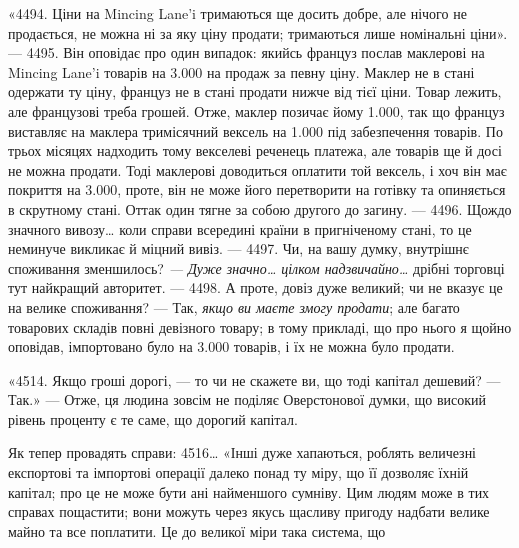 «4494. Ціни на Mincing Lane’i тримаються ще досить добре, але нічого
не продається, не можна ні за яку ціну продати; тримаються лише номінальні
ціни». — 4495. Він оповідає про один випадок: якийсь француз послав маклерові
на Mincing Lane’i товарів на \num{3.000} на продаж за певну ціну. Маклер
не в стані одержати ту ціну, француз не в стані продати нижче від тієї
ціни. Товар лежить, але французові треба грошей. Отже, маклер позичає йому \num{1.000}, так що
француз виставляє на маклера тримісячний вексель на \num{1.000} під забезпечення товарів. По трьох
місяцях надходить тому векселеві
реченець платежа, але товарів ще й досі не можна продати. Тоді маклерові
доводиться оплатити той вексель, і хоч він має покриття на \num{3.000},
проте, він не може його перетворити на готівку та опиняється в скрутному
стані. Оттак один тягне за собою другого до загину. — 4496. Щождо значного
вивозу\dots{} коли справи всередині країни в пригніченому стані, то це неминуче
викликає й міцний вивіз. — 4497. Чи, на вашу думку, внутрішнє споживання зменшилось?
\emph{— Дуже значно\dots{} цілком надзвичайно\dots{}} дрібні торговці тут
найкращий авторитет. — 4498. А проте, довіз дуже великий; чи не вказує це
на велике споживання? — Так, \emph{якщо ви маєте змогу продати}; але багато
товарових складів повні девізного товару; в тому прикладі, що про нього я щойно
оповідав, імпортовано було на \num{3.000} товарів, і їх не можна було продати.

«4514. Якщо гроші дорогі, — то чи не скажете ви, що тоді капітал дешевий?
— Так.» — Отже, ця людина зовсім не поділяє Оверстонової думки, що
високий рівень проценту є те саме, що дорогий капітал.

Як тепер провадять справи: 4516\dots{} «Інші дуже хапаються, роблять
величезні експортові та імпортові операції далеко понад ту міру, що її дозволяє
їхній капітал; про це не може бути ані найменшого сумніву. Цим людям
може в тих справах пощастити; вони можуть через якусь щасливу пригоду
надбати велике майно та все поплатити. Це до великої міри така система, що
\parbreak{}  %
